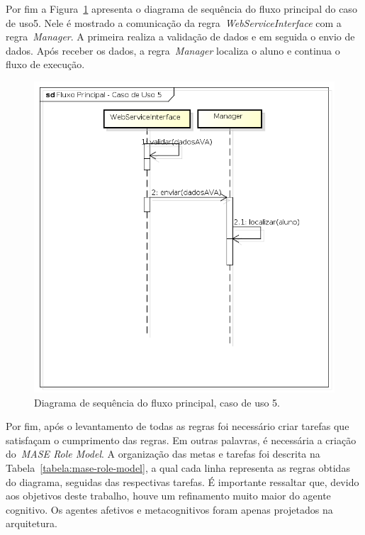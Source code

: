 Por fim a Figura~\ref{fig:dss-uc5-fluxo-principal} apresenta o diagrama de sequência do fluxo principal do caso de uso5. Nele é mostrado a  comunicação da regra~\emph{WebServiceInterface} com a regra~\emph{Manager}. A primeira realiza a validação de dados e em seguida o envio de dados. Após receber os dados, a regra~\emph{Manager} localiza o aluno e continua o fluxo de execução.

\begin{figure}
	\centering
	\includegraphics[scale=0.48]{images/dss-uc5-fluxo-principal.png}
	\caption{Diagrama de sequência do fluxo principal, caso de uso 5.}
	\label{fig:dss-uc5-fluxo-principal}
\end{figure}

Por fim, após o levantamento de todas as regras foi necessário criar tarefas que satisfaçam o cumprimento das regras. Em outras palavras, é necessária a criação do~\emph{MASE Role Model}. A organização das metas e tarefas foi descrita na Tabela~\ref{tabela:mase-role-model}, a qual cada linha representa as regras obtidas do diagrama, seguidas das respectivas tarefas. É importante ressaltar que, devido aos objetivos deste trabalho, houve um refinamento muito maior do agente cognitivo. Os agentes afetivos e metacognitivos foram apenas projetados na arquitetura.

